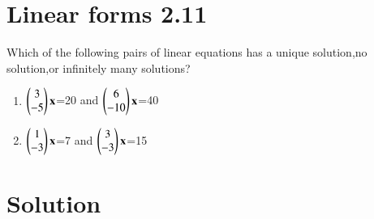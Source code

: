 \documentclass[journal,12pt,twocolumn]{IEEEtran}
\begin{document}
\section{Linear forms 2.11}

Which of the following pairs of linear equations has a unique solution,no solution,or infinitely many solutions?
\begin{enumerate}
    \item $\begin{pmatrix}3\\-5\end{pmatrix}\mathbf{x}$=20 and $\begin{pmatrix}6\\-10\end{pmatrix}\mathbf{x}$=40
    \item $\begin{pmatrix}1\\-3\end{pmatrix}\mathbf{x}$=7 and $\begin{pmatrix}3\\-3\end{pmatrix}\mathbf{x}$=15
\end{enumerate}
%
%
\section{Solution}
\end{document}
